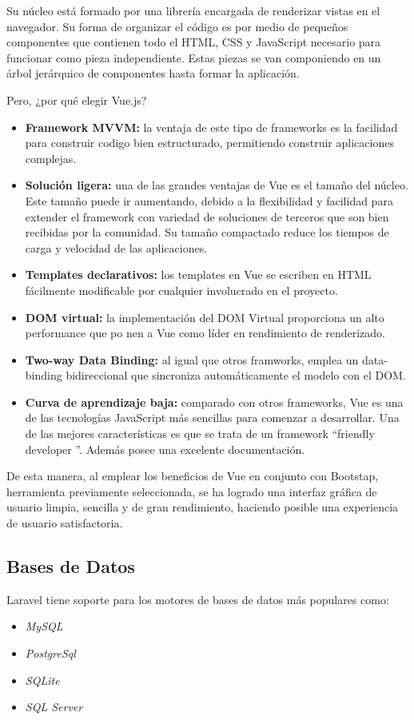 \documentclass[11pt,oneside]{book}
\begin{document}
Su núcleo está formado por una librería encargada de renderizar vistas en el navegador. Su forma de organizar el código es por medio de pequeños componentes que contienen todo el HTML, CSS y JavaScript necesario para funcionar como pieza independiente. Estas piezas se van componiendo en un árbol jerárquico de componentes hasta formar la aplicación.

Pero, ¿por qué elegir Vue.js?
\begin{itemize}
\item \textbf{Framework MVVM:} la ventaja de este tipo de frameworks es la facilidad para construir codigo bien estructurado, permitiendo construir aplicaciones complejas.
\item \textbf{Solución ligera:} una de las grandes ventajas de Vue es el tamaño del núcleo. Este tamaño puede ir aumentando, debido a la flexibilidad y facilidad para extender el framework con variedad de soluciones de terceros que son bien recibidas por la comunidad. Su tamaño compactado reduce los tiempos de carga y velocidad de las aplicaciones.
\item \textbf{Templates declarativos:} los templates en Vue se escriben en HTML fácilmente modificable por cualquier involucrado en el proyecto.
\item \textbf{DOM virtual:} la implementación del DOM Virtual proporciona un alto performance que po nen a Vue como líder en rendimiento de renderizado.
\item \textbf{Two-way Data Binding:} al igual que otros framworks, emplea un data-binding bidireccional que sincroniza automáticamente el modelo con el DOM.
\item \textbf{Curva de aprendizaje baja:} comparado con otros frameworks, Vue es una de las tecnologías JavaScript más sencillas para comenzar a desarrollar. Una de las mejores características es que se trata de un framework “friendly developer ”. Además posee una excelente documentación.
\end{itemize}

De esta manera, al emplear los beneficios de Vue en conjunto con Bootstap, herramienta previamente seleccionada, se ha logrado una interfaz gráfica de usuario limpia, sencilla y de gran rendimiento, haciendo posible una experiencia de usuario satisfactoria.

\subsection{Bases de Datos}
Laravel tiene soporte para los motores de bases de datos más populares como:
\begin{itemize}
\item \textit{MySQL}
\item \textit{PostgreSql}
\item \textit{SQLite}
\item \textit{SQL Server}
\end{itemize}
\end{document}
